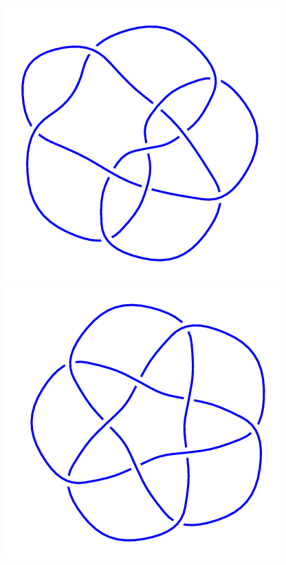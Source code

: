 \begin{figure}[H]
    \begin{minipage}[b]{.18\linewidth}
        \centering
        \includegraphics[width=\linewidth]{../data/10_122.png}
    \end{minipage}
    \begin{minipage}[b]{.18\linewidth}
        \centering
        \includegraphics[width=\linewidth]{../data/10_123.png}

\end{minipage}
\end{figure}
